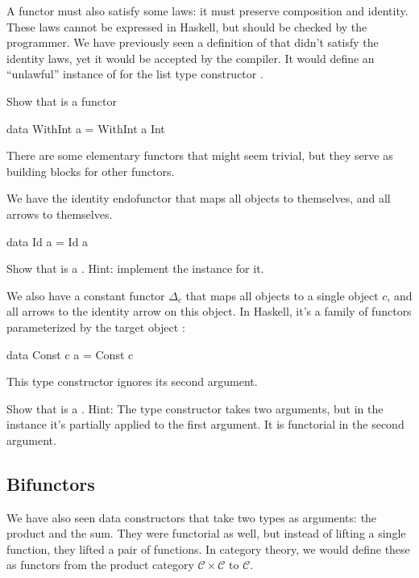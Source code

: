 \documentclass[DaoFP]{subfiles}
\begin{document}
A functor must also satisfy some laws: it must preserve composition and identity. These laws cannot be expressed in Haskell, but should be checked by the programmer. We have previously seen a definition of  that didn't satisfy the identity laws, yet it would be accepted by the compiler. It would define an ``unlawful'' instance of  for the list type constructor \hask{[]}.

\begin{exercise}
Show that  is a functor
\begin{haskell}
data WithInt a = WithInt a Int
\end{haskell}
\end{exercise}

There are some elementary functors that might seem trivial, but they serve as building blocks for other functors. 

We have the identity endofunctor that maps all objects to themselves, and all arrows to themselves. 
\begin{haskell}
data Id a = Id a
\end{haskell}
\begin{exercise}
Show that  is a . Hint: implement the  instance for it.
\end{exercise}


We also have a constant functor $\Delta_c$ that maps all objects to a single object $c$, and all arrows to the identity arrow on this object. In Haskell, it's a family of functors parameterized by the target object :
\begin{haskell}
data Const c a = Const c
\end{haskell}
This type constructor ignores its second argument.


\begin{exercise}
Show that  is a . Hint: The type constructor takes two arguments, but in the  instance it's partially applied to the first argument. It is functorial in the second argument.
\end{exercise}


\subsection{Bifunctors}

We have also seen data constructors that take two types as arguments: the product and the sum. They were functorial as well, but instead of lifting a single function, they lifted a pair of functions. In category theory, we would define these as functors from the product category $\mathcal{C} \times \mathcal{C}$ to $\mathcal{C}$.
\end{document}
